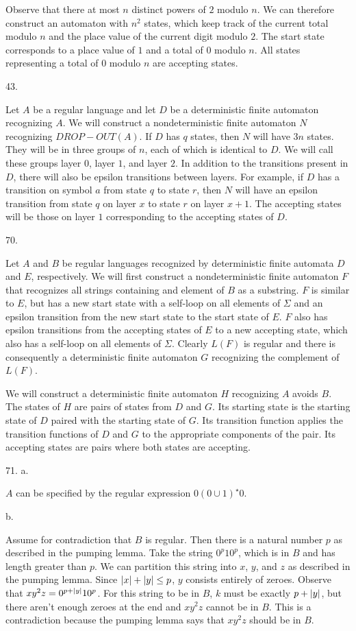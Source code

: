 Observe that there at most $n$ distinct powers of $2$ modulo $n$.
We can therefore construct an automaton with $n^2$ states,
which keep track of the current total modulo $n$
and the place value of the current digit modulo $2$.
The start state corresponds to a place value of $1$
and a total of $0$ modulo $n$.
All states representing a total of $0$ modulo $n$ are accepting states.
\bigskip
\item{43.}

Let $A$ be a regular language and
let $D$ be a deterministic finite automaton recognizing $A$.
We will construct a nondeterministic finite automaton $N$
recognizing $DROP-OUT(A)$.
If $D$ has $q$ states, then $N$ will have $3n$ states.
They will be in three groups of $n$, each of which is identical to $D$.
We will call these groups layer $0$, layer $1$, and layer $2$.
In addition to the transitions present in $D$,
there will also be epsilon transitions between layers.
For example, if $D$ has a transition on symbol $a$
from state $q$ to state $r$, then $N$ will have an epsilon transition
from state $q$ on layer $x$ to state $r$ on layer $x + 1$.
The accepting states will be those on layer $1$ corresponding
to the accepting states of $D$.
\bigskip
\item{70.}

Let $A$ and $B$ be regular languages recognized by
deterministic finite automata $D$ and $E$, respectively.
We will first construct a nondeterministic finite automaton $F$ that
recognizes all strings containing and element of $B$ as a substring.
$F$ is similar to $E$, but has a new start state with a self-loop
on all elements of $\Sigma$ and an epsilon transition
from the new start state to the start state of $E$.
$F$ also has epsilon transitions
from the accepting states of $E$ to a new accepting state,
which also has a self-loop on all elements of $\Sigma$.
Clearly $L(F)$ is regular and there is consequently
a deterministic finite automaton $G$
recognizing the complement of $L(F)$.

We will construct a deterministic finite automaton $H$
recognizing $A$ avoids $B$.
The states of $H$ are pairs of states from $D$ and $G$.
Its starting state is the starting state of $D$
paired with the starting state of $G$.
Its transition function applies the transition
functions of $D$ and $G$ to the appropriate components of the pair.
Its accepting states are pairs where both states are accepting.
\bigskip
\item{71.} a.

$A$ can be specified by the regular expression $0 (0 \cup 1)^\star 0$.
\medskip
\item{} b.

Assume for contradiction that $B$ is regular.
Then there is a natural number $p$ as described in the pumping lemma.
Take the string $0^p 1 0^p$, which is in $B$ and has length greater than $p$.
We can partition this string into $x$, $y$, and $z$
as described in the pumping lemma.
Since $\vert{x}\vert + \vert{y}\vert \le p$, $y$ consists entirely of zeroes.
Observe that $x y^2 z = 0^{p + \vert{y}\vert} 1 0^p$.
For this string to be in $B$, $k$ must be exactly $p + \vert{y}\vert$,
but there aren't enough zeroes at the end
and $x y^2 z$ cannot be in $B$.
This is a contradiction because the pumping lemma says that
$x y^2 z$ should be in $B$.
\bye
